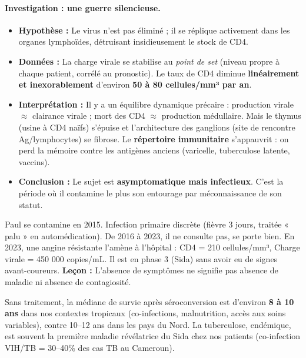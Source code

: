 \documentclass[11pt]{article}
\begin{document}
\paragraph{Investigation : une guerre silencieuse.}
\begin{itemize}
    \item \textbf{Hypothèse :} Le virus n'est pas éliminé ; il se réplique activement dans les organes lymphoïdes, détruisant insidieusement le stock de CD4.
    \item \textbf{Données :} La charge virale se stabilise au \emph{point de set} (niveau propre à chaque patient, corrélé au pronostic). Le taux de CD4 diminue \textbf{linéairement et inexorablement} d'environ \textbf{50 à 80 cellules/mm³ par an}.
    \item \textbf{Interprétation :} Il y a un équilibre dynamique précaire : production virale $\approx$ clairance virale ; mort des CD4 $\approx$ production médullaire. Mais le thymus (usine à CD4 naïfs) s'épuise et l'architecture des ganglions (site de rencontre Ag/lymphocytes) se fibrose. Le \textbf{répertoire immunitaire} s'appauvrit : on perd la mémoire contre les antigènes anciens (varicelle, tuberculose latente, vaccins).
    \item \textbf{Conclusion :} Le sujet est \textbf{asymptomatique mais infectieux}. C'est la période où il contamine le plus son entourage par méconnaissance de son statut.
\end{itemize}

\begin{exemplebox}
Paul se contamine en 2015. Infection primaire discrète (fièvre 3 jours, traitée « palu » en automédication). De 2016 à 2023, il ne consulte pas, se porte bien. En 2023, une angine résistante l'amène à l'hôpital : CD4 = 210 cellules/mm³, Charge virale = 450 000 copies/mL. Il est en phase 3 (Sida) sans avoir eu de signes avant-coureurs. \textbf{Leçon :} L'absence de symptômes ne signifie pas absence de maladie ni absence de contagiosité.
\end{exemplebox}

\begin{savaistu}
Sans traitement, la médiane de survie après séroconversion est d'environ \textbf{8 à 10 ans} dans nos contextes tropicaux (co-infections, malnutrition, accès aux soins variables), contre 10--12 ans dans les pays du Nord. La tuberculose, endémique, est souvent la première maladie révélatrice du Sida chez nos patients (co-infection VIH/TB = 30--40\% des cas TB au Cameroun).
\end{savaistu}
\end{document}
